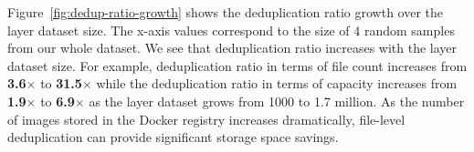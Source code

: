 Figure~\ref{fig:dedup-ratio-growth} shows the deduplication ratio growth over the layer dataset size. The x-axis values correspond to the size of 4 random samples from our whole dataset. We see that deduplication ratio increases with the layer dataset size.
%
For example, deduplication ratio
in terms of file count increases from \textbf{3.6$\times$} to \textbf{31.5$\times$} while the deduplication ratio in terms of capacity increases from \textbf{1.9$\times$} to \textbf{6.9$\times$}  
as the layer dataset grows from 1000 to 1.7 million.
% 
As the number of images stored in the Docker registry increases dramatically,
file-level deduplication can provide significant storage space savings.
